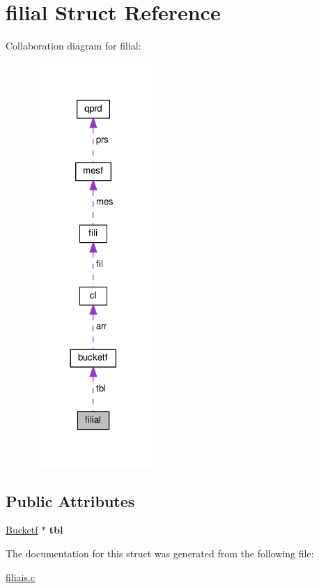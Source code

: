 \hypertarget{structfilial}{}\section{filial Struct Reference}
\label{structfilial}


Collaboration diagram for filial\+:
\nopagebreak
\begin{figure}[H]
\begin{center}
\leavevmode
\includegraphics[width=129pt]{structfilial__coll__graph}
\end{center}
\end{figure}
\subsection*{Public Attributes}
\begin{DoxyCompactItemize}
\item 
\mbox{\label{structfilial_a5359322cd99e7c14e9af0f7e0d16daf8}} 
\hyperlink{structbucketf}{Bucketf} $\ast$ {\bfseries tbl}
\end{DoxyCompactItemize}


The documentation for this struct was generated from the following file\+:\begin{DoxyCompactItemize}
\item 
\hyperlink{filiais_8c}{filiais.\+c}\end{DoxyCompactItemize}
